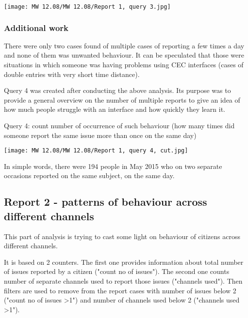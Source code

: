 \begin{center}
  \texttt{[image: MW 12.08/MW 12.08/Report 1, query 3.jpg]}
  \label{normal_case}
\end{center}
	
			\subsubsection{Additional work}
			
There were only two cases found of multiple cases of reporting a few times a day and none of them was unwanted behaviour. It can be speculated that those were situations in which someone was having problems using CEC interfaces (cases of double entries with very short time distance).

Query 4 was created after conducting the above analysis. Its purpose was to provide a general overview on the number of multiple reports to give an idea of how much people struggle with an interface and how quickly they learn it.

Query 4: count number of occurrence of such behaviour (how many times did someone report the same issue more than once on the same day)

\begin{center}
  \texttt{[image: MW 12.08/MW 12.08/Report 1, query 4, cut.jpg]}
  \label{normal_case}
\end{center}



In simple words, there were 194 people in May 2015 who on two separate occasions reported on the same subject, on the same day.
			
		\subsection{Report 2 - patterns of behaviour across different channels}
		
This part of analysis is trying to cast some light on behaviour of citizens across different channels.

It is based on 2 counters. The first one provides information about total number of issues reported by a citizen ("count no of issues"). The second one counts number of separate channels used to report those issues ("channels used"). Then filters are used to remove from the report cases with number of issues below 2 ("count no of issues \textgreater 1") and number of channels used below 2 ("channels used \textgreater 1").

